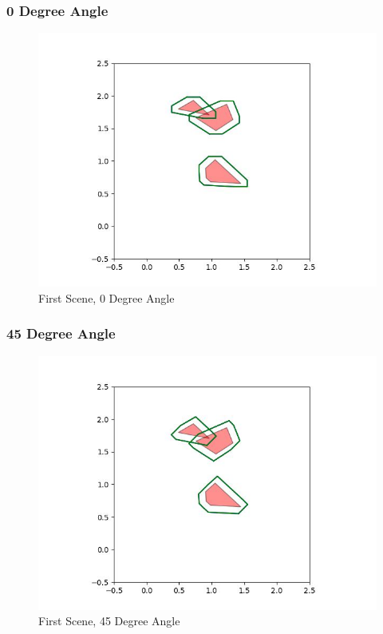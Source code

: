 \documentclass{article}
\begin{document}
\subsubsection{0 Degree Angle}
\begin{figure}[h!]
	\includegraphics[width= 0.9 \linewidth]{Problem3_minkowski1_0.jpg}
	\centering
	\caption{First Scene, 0 Degree Angle}
	\label{Problem3_minkowski1_0.jpg}
\end{figure}

\newpage
\subsubsection{45 Degree Angle}
\begin{figure}[h!]
	\includegraphics[width= 0.9 \linewidth]{Problem3_minkowski1_45.jpg}
	\centering
	\caption{First Scene, 45 Degree Angle}
	\label{Problem3_minkowski1_45.jpg}
\end{figure}
\end{document}
